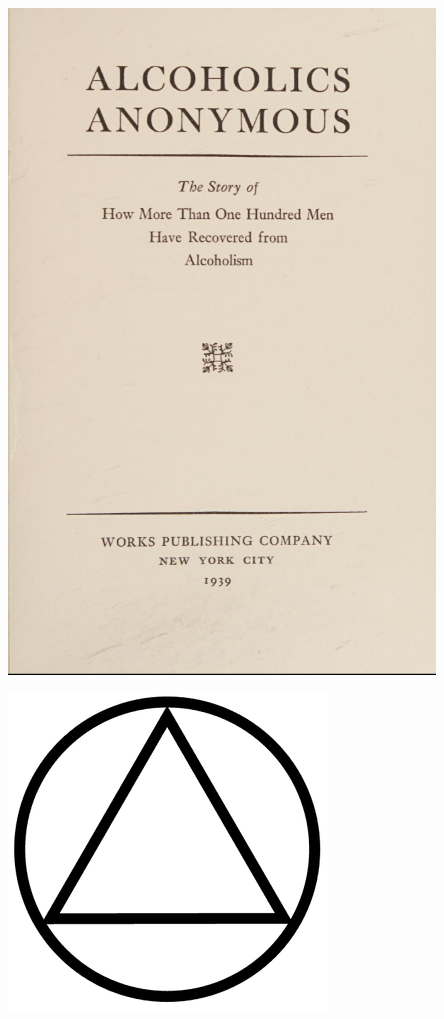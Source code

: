 \begin{titlingpage}
\begin{biblechapter}
\end{biblechapter}

\newpage
\begin{biblechapter}


    \centering
    \vspace{1mm}
    \includegraphics[width=0.85\textwidth]{img/titlepage-ed1.png}

\end{biblechapter}

\newpage
\begin{biblechapter}

    \centering
    \vspace*{\fill}
    \includegraphics[scale=0.9]{img/symbol1.png}
    \vspace*{\fill}


\end{biblechapter}
\end{titlingpage}
